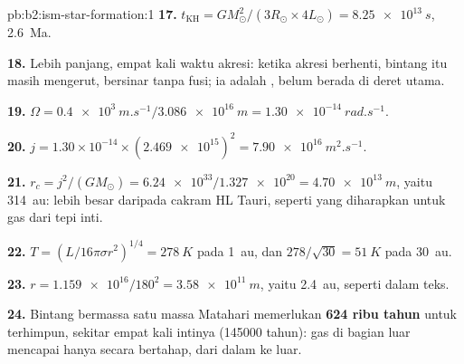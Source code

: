 \begin{solution}{pb:b2:ism-star-formation:1}
\textbf{17.} $t_{\mathrm{KH}} = GM_\odot^2/(3R_\odot\times4L_\odot) = \qty{8.25e13}{s}$,
\qty{2.6}{Ma}.

\textbf{18.} Lebih panjang, empat kali waktu akresi: ketika akresi berhenti, bintang itu
masih mengerut, bersinar tanpa fusi; ia adalah , belum berada di deret
utama.

\textbf{19.} $\Omega = \qty{0.4e3}{m.s^{-1}}/\qty{3.086e16}{m} = \qty{1.30e-14}{rad.s^{-1}}$.

\textbf{20.} $j = 1.30\times10^{-14}\times(\num{2.469e15})^2 = \qty{7.90e16}{m^2.s^{-1}}$.

\textbf{21.} $r_c = j^2/(GM_\odot) = \num{6.24e33}/\num{1.327e20} = \qty{4.70e13}{m}$, yaitu
\qty{314}{au}: lebih besar daripada cakram HL Tauri, seperti yang diharapkan untuk gas dari tepi
inti.

\textbf{22.} $T = (L/16\pi\sigma r^2)^{1/4} = \qty{278}{K}$ pada \qty{1}{au}, dan
$278/\sqrt{30} = \qty{51}{K}$ pada \qty{30}{au}.

\textbf{23.} $r = \num{1.159e16}/180^2 = \qty{3.58e11}{m}$, yaitu \qty{2.4}{au}, seperti dalam teks.

\textbf{24.} Bintang bermassa satu massa Matahari memerlukan
\textbf{\qty[text-series-to-math=true]{624}{} ribu tahun} untuk terhimpun, sekitar empat
kali  intinya (\num{145000} tahun): gas di bagian luar mencapai
 hanya secara bertahap, dari dalam ke luar.
\end{solution}
